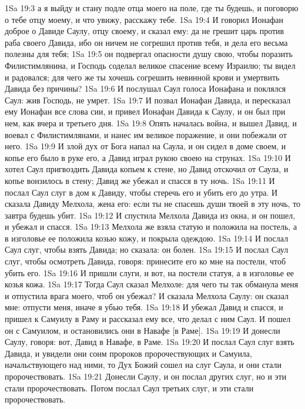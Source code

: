 \vs 1Sa 19:3 а я выйду и стану подле отца моего на поле, где ты будешь, и поговорю о тебе отцу моему, и что увижу, расскажу тебе.
\vs 1Sa 19:4 И говорил Ионафан доброе о Давиде Саулу, отцу своему, и сказал ему: да не грешит царь против раба своего Давида, ибо он ничем не согрешил против тебя, и дела его весьма полезны для тебя;
\vs 1Sa 19:5 он подвергал опасности душу свою, чтобы поразить Филистимлянина, и Господь соделал великое спасение всему Израилю; ты видел  и радовался; для чего же ты хочешь согрешить  невинной крови и умертвить Давида без причины?
\vs 1Sa 19:6 И послушал Саул голоса Ионафана и поклялся Саул: жив Господь,  не умрет.
\vs 1Sa 19:7 И позвал Ионафан Давида, и пересказал ему Ионафан все слова сии, и привел Ионафан Давида к Саулу, и он был при нем, как вчера и третьего дня.
\vs 1Sa 19:8 Опять началась война, и вышел Давид, и воевал с Филистимлянами, и нанес им великое поражение, и они побежали от него.
\vs 1Sa 19:9 И злой дух от Бога напал на Саула, и он сидел в доме своем, и копье его было в руке его, а Давид играл рукою своею на струнах.
\vs 1Sa 19:10 И хотел Саул пригвоздить Давида копьем к стене, но Давид отскочил от Саула, и копье вонзилось в стену; Давид же убежал и спасся в ту ночь.
\vs 1Sa 19:11 И послал Саул слуг в дом к Давиду, чтобы стеречь его и убить его до утра. И сказала Давиду Мелхола, жена его: если ты не спасешь души твоей в эту ночь, то завтра будешь убит.
\vs 1Sa 19:12 И спустила Мелхола Давида из окна, и он пошел, и убежал и спасся.
\vs 1Sa 19:13 Мелхола же взяла статую и положила на постель, а в изголовье ее положила козью кожу, и покрыла одеждою.
\vs 1Sa 19:14 И послал Саул слуг, чтобы взять Давида; но  сказала: он болен.
\vs 1Sa 19:15 И послал Саул слуг, чтобы осмотреть Давида, говоря: принесите его ко мне на постели, чтоб убить его.
\vs 1Sa 19:16 И пришли слуги, и вот, на постели статуя, а в изголовье ее козья кожа.
\vs 1Sa 19:17 Тогда Саул сказал Мелхоле: для чего ты так обманула меня и отпустила врага моего, чтоб он убежал? И сказала Мелхола Саулу: он сказал мне: отпусти меня, иначе я убью тебя.
\vs 1Sa 19:18 И убежал Давид и спасся, и пришел к Самуилу в Раму и рассказал ему все, что делал с ним Саул. И пошел он с Самуилом, и остановились они в Навафе [в Раме].
\vs 1Sa 19:19 И донесли Саулу, говоря: вот, Давид в Навафе, в Раме.
\vs 1Sa 19:20 И послал Саул слуг взять Давида, и  увидели они сонм пророков пророчествующих и Самуила, начальствующего над ними, то Дух Божий сошел на слуг Саула, и они стали пророчествовать.
\vs 1Sa 19:21 Донесли  Саулу, и он послал других слуг, но и эти стали пророчествовать. Потом послал Саул третьих слуг, и эти стали пророчествовать.
